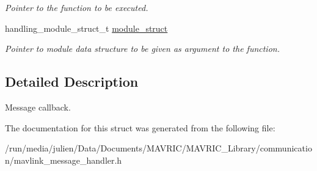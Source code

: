 \begin{DoxyCompactItemize}
\begin{DoxyCompactList}\small\item\em Pointer to the function to be executed. \end{DoxyCompactList}\item 
\hypertarget{structmavlink__message__handler__msg__callback__t_a62207b6f3e0542c139192f8d5275fd5c}{handling\+\_\+module\+\_\+struct\+\_\+t \hyperlink{structmavlink__message__handler__msg__callback__t_a62207b6f3e0542c139192f8d5275fd5c}{module\+\_\+struct}}\label{structmavlink__message__handler__msg__callback__t_a62207b6f3e0542c139192f8d5275fd5c}

\begin{DoxyCompactList}\small\item\em Pointer to module data structure to be given as argument to the function. \end{DoxyCompactList}\end{DoxyCompactItemize}


\subsection{Detailed Description}
Message callback. 

The documentation for this struct was generated from the following file\+:\begin{DoxyCompactItemize}
\item 
/run/media/julien/\+Data/\+Documents/\+M\+A\+V\+R\+I\+C/\+M\+A\+V\+R\+I\+C\+\_\+\+Library/communication/mavlink\+\_\+message\+\_\+handler.\+h\end{DoxyCompactItemize}

